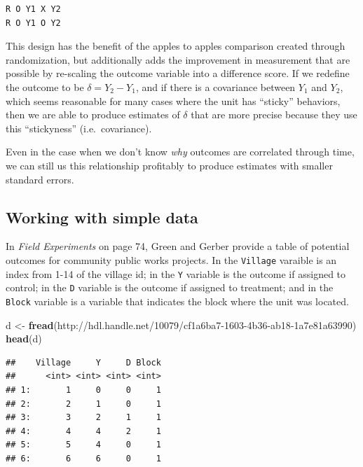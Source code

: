 \documentclass[
]{article}
\newenvironment{Shaded}{\begin{snugshade}}{\end{snugshade}}
\newcommand{\FunctionTok}[1]{\textcolor[rgb]{0.13,0.29,0.53}{\textbf{#1}}}
\newcommand{\NormalTok}[1]{#1}
\newcommand{\OtherTok}[1]{\textcolor[rgb]{0.56,0.35,0.01}{#1}}
\newcommand{\StringTok}[1]{\textcolor[rgb]{0.31,0.60,0.02}{#1}}
\theoremstyle{definition}
\theoremstyle{definition}
\theoremstyle{definition}
\theoremstyle{definition}
\theoremstyle{remark}
\begin{document}
\begin{verbatim}
R O Y1 X Y2
R O Y1 O Y2 
\end{verbatim}

This design has the benefit of the apples to apples comparison created through randomization, but additionally adds the improvement in measurement that are possible by re-scaling the outcome variable into a difference score. If we redefine the outcome to be \(\delta = Y_{2} - Y_{1}\), and if there is a covariance between \(Y_{1}\) and \(Y_{2}\), which seems reasonable for many cases where the unit has ``sticky'' behaviors, then we are able to produce estimates of \(\delta\) that are more precise because they use this ``stickyness'' (i.e.~covariance).

Even in the case when we don't know \emph{why} outcomes are correlated through time, we can still us this relationship profitably to produce estimates with smaller standard errors.

\subsection{Working with simple data}\label{working-with-simple-data}

In \emph{Field Experiments} on page 74, Green and Gerber provide a table of potential outcomes for community public works projects. In the \texttt{Village} varaible is an index from 1-14 of the village id; in the \texttt{Y} variable is the outcome if assigned to control; in the \texttt{D} variable is the outcome if assigned to treatment; and in the \texttt{Block} variable is a variable that indicates the block where the unit was located.

\begin{Shaded}
\begin{Highlighting}[]
\NormalTok{d }\OtherTok{\textless{}{-}} \FunctionTok{fread}\NormalTok{(}\StringTok{\textquotesingle{}http://hdl.handle.net/10079/cf1a6ba7{-}1603{-}4b36{-}ab18{-}1a7e81a63990\textquotesingle{}}\NormalTok{) }
\FunctionTok{head}\NormalTok{(d)}
\end{Highlighting}
\end{Shaded}

\begin{verbatim}
##    Village     Y     D Block
##      <int> <int> <int> <int>
## 1:       1     0     0     1
## 2:       2     1     0     1
## 3:       3     2     1     1
## 4:       4     4     2     1
## 5:       5     4     0     1
## 6:       6     6     0     1
\end{verbatim}
\end{document}
